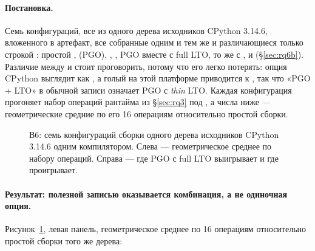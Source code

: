 
\paragraph{Постановка.} Семь конфигураций, все из одного дерева исходников CPython 3.14.6,
вложенного в артефакт, все собранные одним и тем же  и различающиеся только
строкой : простой ,  (PGO),
, , PGO вместе с full LTO, то же с
, и  (\S\ref{sec:rq6b}). Различие между
 и  стоит проговорить, потому что его легко потерять: опция CPython
выглядит как , а голый  на этой платформе
приводится к , так что «PGO + LTO» в обычной записи означает PGO с \emph{thin}
LTO. Каждая конфигурация прогоняет набор операций рантайма из \S\ref{sec:rq3} под , а
числа ниже --- геометрические средние по его 16 операциям относительно простой сборки.

\begin{figure}[t]
  \centering
  \caption{В6: семь конфигураций сборки одного дерева исходников CPython 3.14.6 одним
    компилятором. Слева --- геометрическое среднее по набору операций. Справа --- где PGO с full
    LTO выигрывает и где проигрывает.}
  \label{fig:realbuilds}
\end{figure}

\paragraph{Результат: полезной записью оказывается комбинация, а не одиночная опция.}
Рисунок~\ref{fig:realbuilds}, левая панель, геометрическое среднее по 16
операциям относительно простой сборки  того же дерева:

